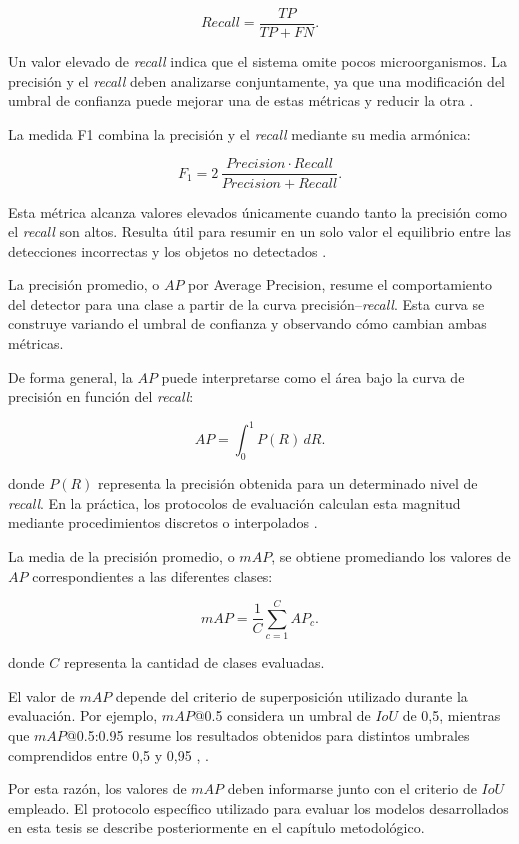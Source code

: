\[
Recall=\frac{TP}{TP+FN}.
\]

Un valor elevado de \textit{recall} indica que el sistema omite pocos microorganismos. La precisión y el \textit{recall} deben analizarse conjuntamente, ya que una modificación del umbral de confianza puede mejorar una de estas métricas y reducir la otra \cite{powers2011}.

La medida F1 combina la precisión y el \textit{recall} mediante su media armónica:

\[
F_1=2\,\frac{Precision\cdot Recall}{Precision+Recall}.
\]

Esta métrica alcanza valores elevados únicamente cuando tanto la precisión como el \textit{recall} son altos. Resulta útil para resumir en un solo valor el equilibrio entre las detecciones incorrectas y los objetos no detectados \cite{powers2011}.

La precisión promedio, o $AP$ por Average Precision, resume el comportamiento del detector para una clase a partir de la curva precisión–\textit{recall}. Esta curva se construye variando el umbral de confianza y observando cómo cambian ambas métricas.

De forma general, la $AP$ puede interpretarse como el área bajo la curva de precisión en función del \textit{recall}:

\[
AP=\int_0^1 P(R)\,dR.
\]

donde $P(R)$ representa la precisión obtenida para un determinado nivel de \textit{recall}. En la práctica, los protocolos de evaluación calculan esta magnitud mediante procedimientos discretos o interpolados \cite{everingham2010}.

La media de la precisión promedio, o $mAP$, se obtiene promediando los valores de $AP$ correspondientes a las diferentes clases:

\[
mAP=\frac{1}{C}\sum_{c=1}^{C}AP_c.
\]

donde $C$ representa la cantidad de clases evaluadas.

El valor de $mAP$ depende del criterio de superposición utilizado durante la evaluación. Por ejemplo, $mAP$@0.5 considera un umbral de $IoU$ de 0,5, mientras que $mAP$@0.5:0.95 resume los resultados obtenidos para distintos umbrales comprendidos entre 0,5 y 0,95 \cite{lin2014}, \cite{cocoapi2015}.

Por esta razón, los valores de $mAP$ deben informarse junto con el criterio de $IoU$ empleado. El protocolo específico utilizado para evaluar los modelos desarrollados en esta tesis se describe posteriormente en el capítulo metodológico.

